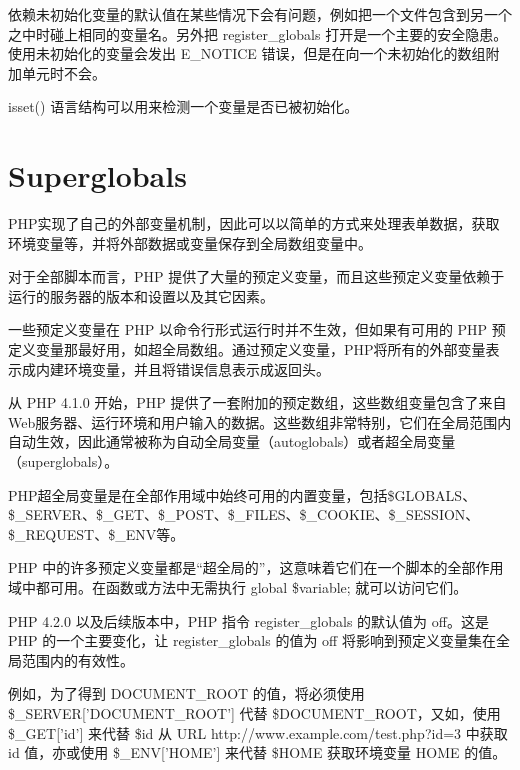 依赖未初始化变量的默认值在某些情况下会有问题，例如把一个文件包含到另一个之中时碰上相同的变量名。另外把 register\_globals 打开是一个主要的安全隐患。使用未初始化的变量会发出 E\_NOTICE 错误，但是在向一个未初始化的数组附加单元时不会。

isset() 语言结构可以用来检测一个变量是否已被初始化。



\chapter{Superglobals}


PHP实现了自己的外部变量机制，因此可以以简单的方式来处理表单数据，获取环境变量等，并将外部数据或变量保存到全局数组变量中。




对于全部脚本而言，PHP 提供了大量的预定义变量，而且这些预定义变量依赖于运行的服务器的版本和设置以及其它因素。



一些预定义变量在 PHP 以命令行形式运行时并不生效，但如果有可用的 PHP 预定义变量那最好用，如超全局数组。通过预定义变量，PHP将所有的外部变量表示成内建环境变量，并且将错误信息表示成返回头。






从 PHP 4.1.0 开始，PHP 提供了一套附加的预定数组，这些数组变量包含了来自Web服务器、运行环境和用户输入的数据。这些数组非常特别，它们在全局范围内自动生效，因此通常被称为自动全局变量（autoglobals）或者超全局变量（superglobals）。



PHP超全局变量是在全部作用域中始终可用的内置变量，包括\$GLOBALS、\$\_SERVER、\$\_GET、\$\_POST、\$\_FILES、\$\_COOKIE、\$\_SESSION、\$\_REQUEST、\$\_ENV等。



PHP 中的许多预定义变量都是“超全局的”，这意味着它们在一个脚本的全部作用域中都可用。在函数或方法中无需执行 global \$variable; 就可以访问它们。




PHP 4.2.0 以及后续版本中，PHP 指令 register\_globals 的默认值为 off。这是 PHP 的一个主要变化，让 register\_globals 的值为 off 将影响到预定义变量集在全局范围内的有效性。

例如，为了得到 DOCUMENT\_ROOT 的值，将必须使用 \$\_SERVER['DOCUMENT\_ROOT'] 代替 \$DOCUMENT\_ROOT，又如，使用 \$\_GET['id'] 来代替 \$id 从 URL http://www.example.com/test.php?id=3 中获取 id 值，亦或使用 \$\_ENV['HOME'] 来代替 \$HOME 获取环境变量 HOME 的值。




